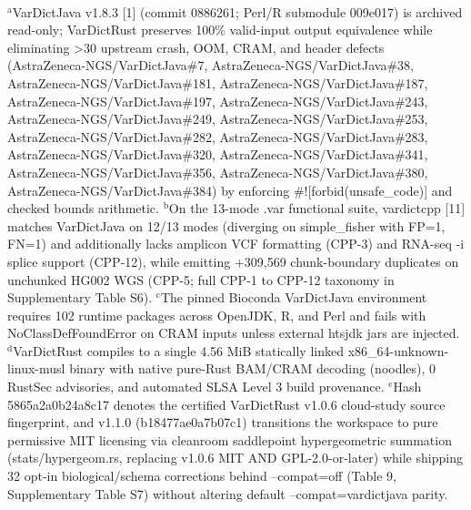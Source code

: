 \begin{table}[htbp]
\\[4pt]\footnotesize{$^{\text{a}}$VarDictJava v1.8.3 [1] (commit 0886261; Perl/R submodule 009e017) is archived read-only; VarDictRust preserves 100\% valid-input output equivalence while eliminating \textgreater{}30 upstream crash, OOM, CRAM, and header defects (AstraZeneca-NGS/VarDictJava\#7, AstraZeneca-NGS/VarDictJava\#38, AstraZeneca-NGS/VarDictJava\#181, AstraZeneca-NGS/VarDictJava\#187, AstraZeneca-NGS/VarDictJava\#197, AstraZeneca-NGS/VarDictJava\#243, AstraZeneca-NGS/VarDictJava\#249, AstraZeneca-NGS/VarDictJava\#253, AstraZeneca-NGS/VarDictJava\#282, AstraZeneca-NGS/VarDictJava\#283, AstraZeneca-NGS/VarDictJava\#320, AstraZeneca-NGS/VarDictJava\#341, AstraZeneca-NGS/VarDictJava\#356, AstraZeneca-NGS/VarDictJava\#380, AstraZeneca-NGS/VarDictJava\#384) by enforcing \#![forbid(unsafe\_code)] and checked bounds arithmetic. $^{\text{b}}$On the 13-mode .var functional suite, vardictcpp [11] matches VarDictJava on 12/13 modes (diverging on simple\_fisher with FP=1, FN=1) and additionally lacks amplicon VCF formatting (CPP-3) and RNA-seq -i splice support (CPP-12), while emitting +309,569 chunk-boundary duplicates on unchunked HG002 WGS (CPP-5; full CPP-1 to CPP-12 taxonomy in Supplementary Table S6). $^{\text{c}}$The pinned Bioconda VarDictJava environment requires 102 runtime packages across OpenJDK, R, and Perl and fails with NoClassDefFoundError on CRAM inputs unless external htsjdk jars are injected. $^{\text{d}}$VarDictRust compiles to a single 4.56 MiB statically linked x86\_64-unknown-linux-musl binary with native pure-Rust BAM/CRAM decoding (noodles), 0 RustSec advisories, and automated SLSA Level 3 build provenance. $^{\text{e}}$Hash 5865a2a0b24a8c17 denotes the certified VarDictRust v1.0.6 cloud-study source fingerprint, and v1.1.0 (b18477ae0a7b07c1) transitions the workspace to pure permissive MIT licensing via cleanroom saddlepoint hypergeometric summation (stats/hypergeom.rs, replacing v1.0.6 MIT AND GPL-2.0-or-later) while shipping 32 opt-in biological/schema corrections behind --compat=off (Table 9, Supplementary Table S7) without altering default --compat=vardictjava parity.}
\end{table}
